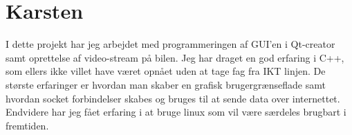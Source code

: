 \section{Karsten}
I dette projekt har jeg arbejdet med programmeringen af GUI'en i Qt-creator samt oprettelse af video-stream på bilen. Jeg har draget en god erfaring i C++, som ellers ikke villet have været opnået uden at tage fag fra IKT linjen. De største erfaringer er hvordan man skaber en grafisk brugergrænseflade samt hvordan socket forbindelser skabes og bruges til at sende data over internettet. Endvidere har jeg fået erfaring i at bruge linux som vil være særdeles brugbart i fremtiden.  